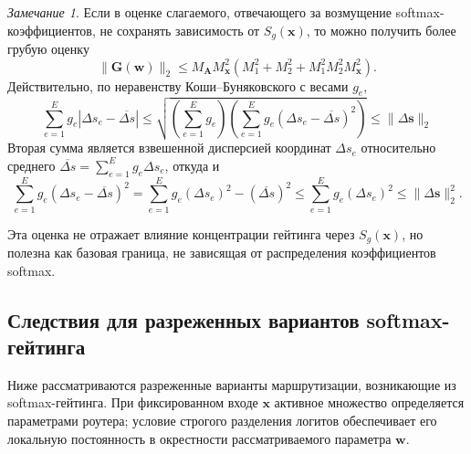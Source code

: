 \documentclass[11pt]{extarticle}
\theoremstyle{definition}
\newcounter{theoremchild}[theorem]
\theoremstyle{plain}
\theoremstyle{remark}
\newtheorem{remark}[theoremchild]{Замечание}
\begin{document}
\begin{remark}
\label{rem:moe-softmax-simple-bound}
Если в оценке слагаемого, отвечающего за возмущение softmax-коэффициентов, не сохранять зависимость от $S_g(\mathbf x)$, то можно получить более грубую оценку
$$
    \|\mathbf G(\mathbf w)\|_2
    \le
    M_{\mathbf A}M_{\mathbf x}^2
    \left(
        M_1^2+M_2^2+M_1^2M_2^2M_{\mathbf x}^2
    \right).
$$
Действительно, по неравенству Коши--Буняковского с весами $g_e$,
$$
\sum_{e=1}^{E}g_e|\Delta s_e-\overline{\Delta s}|
\le
\sqrt{
\left(\sum\limits_{e=1}^{E}g_e\right)
\left(
\sum\limits_{e=1}^{E}
g_e(\Delta s_e-\overline{\Delta s})^2
\right)
} \leq \|\Delta\mathbf s\|_2
$$
Вторая сумма является взвешенной дисперсией координат $\Delta s_e$ относительно среднего
$
\overline{\Delta s}=\sum\limits_{e=1}^{E}g_e\Delta s_e
$,
откуда и
$$
\sum\limits_{e=1}^{E}
g_e(\Delta s_e-\overline{\Delta s})^2
=
\sum\limits_{e=1}^{E}g_e(\Delta s_e)^2
-
(\overline{\Delta s})^2
\le
\sum\limits_{e=1}^{E}g_e(\Delta s_e)^2
\le
\|\Delta\mathbf s\|_2^2.
$$

Эта оценка не отражает влияние концентрации гейтинга через $S_g(\mathbf x)$, но полезна как базовая граница, не зависящая от распределения коэффициентов softmax.
\end{remark}

\subsection{Следствия для разреженных вариантов softmax-гейтинга}

Ниже рассматриваются разреженные варианты маршрутизации, возникающие из softmax-гейтинга. При фиксированном входе $\mathbf x$ активное множество определяется параметрами роутера; условие строгого разделения логитов обеспечивает его локальную постоянность в окрестности рассматриваемого параметра $\mathbf w$.
\end{document}
